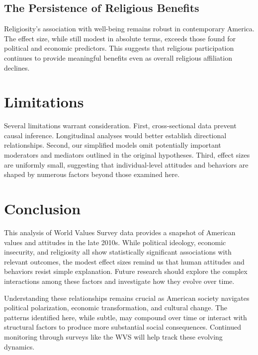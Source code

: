 \documentclass[12pt,a4paper]{article}
\begin{document}
\subsection{The Persistence of Religious Benefits}

Religiosity's association with well-being remains robust in contemporary America. 
The effect size, while still modest in absolute terms, exceeds those found for 
political and economic predictors. This suggests that religious participation 
continues to provide meaningful benefits even as overall religious affiliation 
declines.

\section{Limitations}

Several limitations warrant consideration. First, cross-sectional data prevent 
causal inference. Longitudinal analyses would better establish directional 
relationships. Second, our simplified models omit potentially important moderators 
and mediators outlined in the original hypotheses. Third, effect sizes are 
uniformly small, suggesting that individual-level attitudes and behaviors are 
shaped by numerous factors beyond those examined here.

\section{Conclusion}

This analysis of World Values Survey data provides a snapshot of American values 
and attitudes in the late 2010s. While political ideology, economic insecurity, 
and religiosity all show statistically significant associations with relevant 
outcomes, the modest effect sizes remind us that human attitudes and behaviors 
resist simple explanation. Future research should explore the complex interactions 
among these factors and investigate how they evolve over time.

Understanding these relationships remains crucial as American society navigates 
political polarization, economic transformation, and cultural change. The patterns 
identified here, while subtle, may compound over time or interact with structural 
factors to produce more substantial social consequences. Continued monitoring 
through surveys like the WVS will help track these evolving dynamics.



\end{document}
